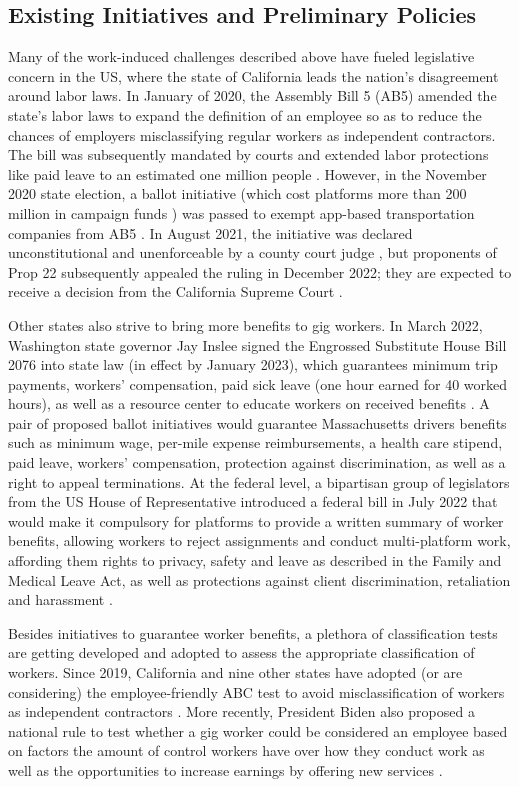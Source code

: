 \subsection{Existing Initiatives and Preliminary Policies}
Many of the work-induced challenges described above have fueled legislative concern in the US, where the state of California leads the nation's disagreement around labor laws. In January of 2020, the Assembly Bill 5 (AB5) amended the state's labor laws to expand the definition of an employee so as to reduce the chances of employers misclassifying regular workers as independent contractors. The bill was subsequently mandated by courts and extended labor protections like paid leave to an estimated one million people \cite{noauthor_2021-px}. However, in the November 2020 state election, a ballot initiative (which cost platforms more than 200 million in campaign funds \cite{Stecker2020-xk}) was passed to exempt app-based transportation companies from AB5 \cite{Hussain2022-lr}. In August 2021, the initiative was declared unconstitutional and unenforceable by a county court judge \cite{Gedye2023-ru, unconstitutional}, but proponents of Prop 22 subsequently appealed the ruling in December 2022; they are expected to receive a decision from the California Supreme Court \cite{Yakal2023-ka}.

Other states also strive to bring more benefits to gig workers. In March 2022, Washington state governor Jay Inslee signed the Engrossed Substitute House Bill 2076 into state law (in effect by January 2023), which guarantees minimum trip payments, workers' compensation, paid sick leave (one hour earned for 40 worked hours), as well as a resource center to educate workers on received benefits \cite{Fletcher2022-qr}. A pair of proposed ballot initiatives would guarantee Massachusetts drivers benefits such as minimum wage, per-mile expense reimbursements, a health care stipend, paid leave, workers' compensation, protection against discrimination, as well as a right to appeal terminations. At the federal level, a bipartisan group of legislators from the US House of Representative introduced a federal bill in July 2022 that would make it compulsory for platforms to provide a written summary of worker benefits, allowing workers to reject assignments and conduct multi-platform work, affording them rights to privacy, safety and leave as described in the Family and Medical Leave Act, as well as protections against client discrimination, retaliation and harassment \cite{Shepherd2022-ed}.

Besides initiatives to guarantee worker benefits, a plethora of classification tests are getting developed and adopted to assess the appropriate classification of workers. Since 2019, California and nine other states have adopted (or are considering) the employee-friendly ABC test to avoid misclassification of workers as independent contractors \cite{Iacurci2022-po}. More recently, President Biden also proposed a national rule to test whether a gig worker could be considered an employee based on factors the amount of control workers have over how they conduct work as well as the opportunities to increase earnings by offering new services \cite{Scheiber2022-oo}. 

